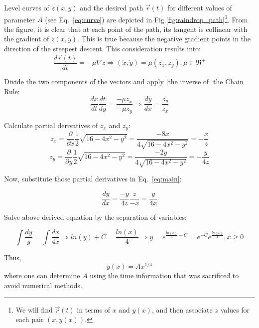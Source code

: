 \documentclass{article}
\begin{document}
Level curves of $z(x, y)$ and the desired path $\vec{r}(t)$ for different values of parameter $A$ (see Eq.~\eqref{eq:curve}) are depicted in Fig.\ref{fig:raindrop_path}\footnote{We will find $\vec{r}(t)$ in terms of $x$ and $y(x)$, and then associate $z$ values for each pair $(x, y(x))$.}. From the figure, it is clear that at each point of the path, its tangent is collinear with the gradient of $z(x, y)$. This is true because the negative gradient points in the direction of the steepest descent. This consideration results into:
\begin{equation*}
  \frac{d\vec{r}(t)}{dt} = - \mu \nabla{z} \Rightarrow (\dot{x}, \dot{y}) = \mu (z_x, z_y), \mu \in \Re^{+}
\end{equation*}

Divide the two components of the vectors and apply [the inverse of] the Chain Rule:
\begin{equation} \label{eq:main}
  \frac{dx}{dt} \frac{dt}{dy} = \frac{-\mu z_x}{-\mu z_y} \Rightarrow \frac{dy}{dx} = \frac{z_y}{z_x}
\end{equation}

Calculate partial derivatives of $z_x$ and $z_y$:
\begin{equation*}
  z_x = \frac{\partial}{\partial x}{ \frac{1}{2}\sqrt{16 - 4x^2 - y^2}} = \frac{-8x}{4 \sqrt{16-4x^2-y^2}} = -\frac{x}{z}
\end{equation*}
\begin{equation*}
  z_y = \frac{\partial}{\partial y}{ \frac{1}{2}\sqrt{16 - 4x^2 - y^2}} = \frac{-2y}{4 \sqrt{16-4x^2-y^2}} = -\frac{y}{4z}
\end{equation*}

Now, substitute those partial derivatives in Eq.~\eqref{eq:main}:

\begin{equation*}
  \frac{dy}{dx} = \frac{-y}{4z} \frac{z}{-x} = \frac{y}{4x}
\end{equation*}

Solve above derived equation by the separation of variables:

\begin{equation*}
  \int{\frac{dy}{y}} = \int{\frac{dx}{4x}} \Rightarrow ln(y) + C = \frac{ln(x)}{4} \Rightarrow y = e^{\frac{ln(x)}{4} - C} = e^{-C}e^{\frac{ln(x)}{4}}, x \ge 0
\end{equation*}

Thus,
\begin{equation} \label{eq:curve}
  y(x) = Ax^{1/4}
\end{equation}
where one can determine $A$  using the time information that was sacrificed to avoid numerical methods.
\end{document}
